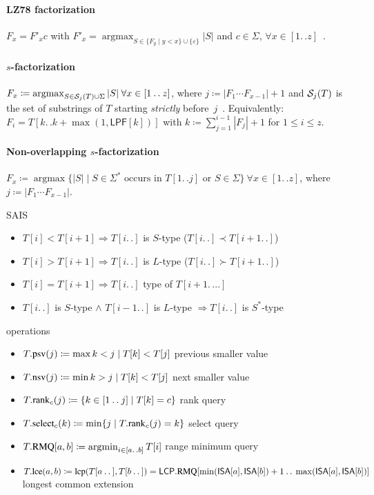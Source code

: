 \documentclass[10pt,landscape]{article}
\newcommand*{\IC}{\mathbin{{.}\,{.}}} %
\newcommand*{\abs}[1]{\ensuremath{|#1|}} %
\newcommand*{\menge}[1]{\ensuremath{\{#1\}}} %
\newcommand*{\instancename}[1]{\ensuremath{\mathsf{#1}}} %
\newcommand*{\LPF} {\instancename{LPF}}
\newcommand*{\LCPA} {\instancename{LCP}}
\newcommand*{\ISA} {\instancename{ISA}}
\newcommand*{\textT}  {\ensuremath{T}}
\newcommand*{\functionname}[1]{{\ensuremath{\renewcommand{\rmdefault}{ptm}\fontfamily{ppl}\selectfont\textrm{\textup{#1}}}}} %
\newcommand*{\select}{\functionname{select}}
\newcommand*{\rank}{\functionname{rank}}
\newcommand*{\RMQ}{\functionname{RMQ}}
\newcommand*{\lcp}{\functionname{lcp}}
\newcommand*{\lce}{\functionname{lce}}
\newcommand*{\psv}{\functionname{psv}}
\newcommand*{\nsv}{\functionname{nsv}}
\newcommand*{\argmax}{\operatorname{argmax}}
\newcommand*{\argmin}{\operatorname{argmin}}
\begin{document}
\begin{multicols}{2}
\paragraph{LZ78 factorization}
$F_x=F'_x c$ with $F'_x = \argmax_{S \in \menge{F_y \mid y < x} \cup \menge{\varepsilon} } \abs{S}$ and $c\in\Sigma$, $\forall x \in [1\IC{} z]$~\cite{ziv78lz}.

\paragraph{$s$-factorization}
$F_x \coloneqq \argmax_{S \in \SubStrPrev{j}{T} \cup \Sigma} \abs{S}~\forall x \in [1\IC{} z]$, where $j \coloneqq \abs{F_1\cdots F_{x-1}}+1$
and $\SubStrPrev{j}{\textT}$ is the set of substrings of $\textT$ starting \emph{strictly} before~$j$~\cite{storer82lzss}.
Equivalently: $F_i = T[k\IC{}k+\max(1,\LPF[k])]$ with $k \coloneqq \sum_{j=1}^{i-1}\abs{F_{j}}+1$ for $1 \le i \le z$.

\paragraph{Non-overlapping $s$-factorization}
$F_x \coloneqq \argmax \menge{ \abs{S} \mid S \in \Sigma^* \text{~occurs in~} T[1\IC{}j] \text{~or~} S \in \Sigma}~\forall
x \in [1\IC{}z]$, where $j \coloneqq \abs{F_1\cdots F_{x-1}}$.



SAIS
	\begin{itemize}
	   \item $\textT[i] < \textT[i+1] \Rightarrow \textT[i\IC{}]$ is $S$-type ($\textT[i\IC{}] \prec \textT[i+1\IC{}]$)
	   \item $\textT[i] > \textT[i+1] \Rightarrow \textT[i\IC{}]$ is $L$-type ($\textT[i\IC{}] \succ \textT[i+1\IC{}]$)
	   \item $\textT[i] = \textT[i+1] \Rightarrow \textT[i\IC{}]$ type of $\textT[i+1\IC{}..]$
	   \item $\textT[i\IC{}]$ is $S$-type $\wedge$ $\textT[i-1\IC{}]$ is $L$-type $\Rightarrow \textT[i\IC{}]$ is $S^*$-type
	\end{itemize}

operations
	\begin{itemize}
	   \item $\textT.\psv(j) \coloneqq \max { k < j \mid \textT[k] < \textT[j] }$ previous smaller value
	   \item $\textT.\nsv(j) \coloneqq \min { k > j \mid \textT[k] < \textT[j] }$ next smaller value
	   \item $\textT.\rank_c(j) \coloneqq \menge{ k \in [1\IC{}j] \mid \textT[k] = c }$ rank query
	   \item $\textT.\select_c(k) \coloneqq \min \menge{j \mid \textT.\rank_c(j) = k}$ select query
	   \item $\textT.\RMQ[a,b] \coloneqq \argmin_{i \in [a\IC{}b]} T[i]$ range minimum query
	   \item $\textT.\lce(a,b) \coloneqq \lcp(T[a\IC{}],T[b\IC{}]) = \LCPA.\RMQ[\min(\ISA[a],\ISA[b])+1\IC{}\max(\ISA[a],\ISA[b])]$ longest common extension
	\end{itemize}



\end{multicols}
\end{document}
